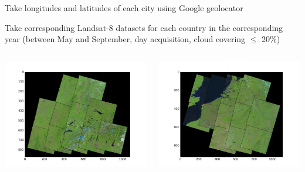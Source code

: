 \documentclass[c]{beamer}
\begin{document}
\begin{frame}
\begin{itemize}
{\begin{columns}
 \end{columns}
 \item Take longitudes and latitudes of each city using Google geolocator
 \item Take corresponding Landsat-8 datasets for each country in the corresponding year (between May and September, day acquisition, cloud covering $\leq$ 20\%)
 \begin{columns}
  \begin{column}{0.33\textwidth}
  \begin{overlayarea}{\linewidth}{3cm}
    \centering\vfill
    \includegraphics[scale=0.20]{images/Switzerland/covering-selection.png}
  \end{overlayarea}
  \end{column}
  \begin{column}{0.33\textwidth}
   \begin{overlayarea}{\linewidth}{3cm}
    \centering\vfill
    \includegraphics[scale=0.20]{images/Belgium/covering-selection.png}

\end{overlayarea}
\end{column}
\end{columns}}
\end{itemize}
\end{frame}
\end{document}
